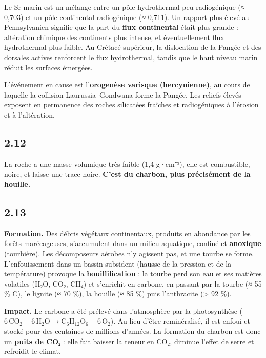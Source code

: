 \documentclass[11pt,a4paper]{article}
\begin{document}
Le Sr marin est un mélange entre un pôle hydrothermal peu radiogénique (≈ 0,703) et un pôle continental radiogénique (≈ 0,711). Un rapport plus élevé au Pennsylvanien signifie que la part du \textbf{flux continental} était plus grande : altération chimique des continents plus intense, et éventuellement flux hydrothermal plus faible. Au Crétacé supérieur, la dislocation de la Pangée et des dorsales actives renforcent le flux hydrothermal, tandis que le haut niveau marin réduit les surfaces émergées.

L'événement en cause est l'\textbf{orogenèse varisque (hercynienne)}, au cours de laquelle la collision Laurussia--Gondwana forme la Pangée. Les reliefs élevés exposent en permanence des roches silicatées fraîches et radiogéniques à l'érosion et à l'altération.

\hypertarget{section-22}{%
\subsection{2.12}\label{section-22}}

La roche a une masse volumique très faible (1,4 g·cm⁻³), elle est combustible, noire, et laisse une trace noire. \textbf{C'est du charbon, plus précisément de la houille.}

\hypertarget{section-23}{%
\subsection{2.13}\label{section-23}}

\textbf{Formation.} Des débris végétaux continentaux, produits en abondance par les forêts marécageuses, s'accumulent dans un milieu aquatique, confiné et \textbf{anoxique} (tourbière). Les décomposeurs aérobes n'y agissent pas, et une tourbe se forme. L'enfouissement dans un bassin subsident (hausse de la pression et de la température) provoque la \textbf{houillification} : la tourbe perd son eau et ses matières volatiles (H₂O, CO₂, CH₄) et s'enrichit en carbone, en passant par la tourbe (≈ 55 \% C), le lignite (≈ 70 \%), la houille (≈ 85 \%) puis l'anthracite (\textgreater{} 92 \%).

\textbf{Impact.} Le carbone a été prélevé dans l'atmosphère par la photosynthèse (\(\mathrm{6\,CO_2} + \mathrm{6\,H_2O} \rightarrow \mathrm{C_6H_{12}O_6} + \mathrm{6\,O_2}\)). Au lieu d'être reminéralisé, il est enfoui et stocké pour des centaines de millions d'années. La formation du charbon est donc un \textbf{puits de CO₂} : elle fait baisser la teneur en CO₂, diminue l'effet de serre et refroidit le climat.
\end{document}
